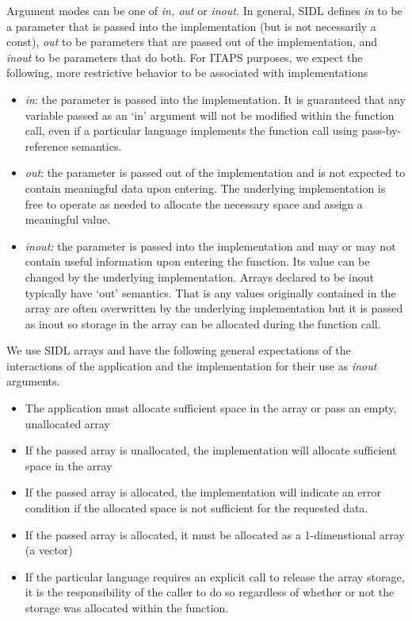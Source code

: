 \documentclass{article}
\begin{document}
Argument modes can be one of \textit{in, out} or \textit{inout.} In general, 
SIDL defines \textit{in} to be a parameter that is passed into the 
implementation (but is not necessarily a const), \textit{out} to be 
parameters that are passed out of the implementation, and \textit{inout} 
to be parameters that do both. For ITAPS purposes, we expect the 
following, more restrictive behavior to be associated with implementations
\begin{itemize}
\item \textit{in}: the parameter is passed into the implementation. It is 
guaranteed that any variable passed as an `in' argument will not 
be modified within the function call, even if a particular language 
implements the function call using pass-by-reference semantics. 
\item \textit{out}: the parameter is passed out of the implementation and 
is not expected to contain meaningful data upon entering. The 
underlying implementation is free to operate as needed to allocate 
the necessary space and assign a meaningful value.
\item \textit{inout:} the parameter is passed into the implementation 
and may or may not contain useful information upon entering the 
function. Its value can be changed by the underlying implementation. 
Arrays declared to be inout typically have `out' semantics. That 
is any values originally contained in the array are often overwritten 
by the underlying implementation but it is passed as inout so 
storage in the array can be allocated during the function call.
\end{itemize}

We use SIDL arrays and have the following general expectations 
of the interactions of the application and the implementation 
for their use as \textit{inout} arguments.
\begin{itemize} 
\item The application must allocate sufficient space in the array or 
pass an empty, unallocated array
\item If the passed array is unallocated, the implementation will allocate 
sufficient space in the array
\item If the passed array is allocated, the implementation will indicate 
an error condition if the allocated space is not sufficient for 
the requested data.
\item If the passed array is allocated, it must be allocated as a 1-dimenstional 
array (a vector)
\item If the particular language requires an explicit call to release 
the array storage, it is the responsibility of the caller to 
do so regardless of whether or not the storage was allocated 
within the function.
\end{itemize}
\end{document}

